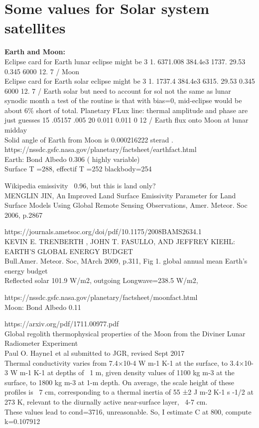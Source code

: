 \documentclass{article}
\begin{document}
\section{Some values for Solar system satellites \label{nomp}}

\textbf{Earth and Moon:} 
\\ Eclipse card for Earth lunar eclipse might be
 3 1. 6371.008 384.4e3 1737. 29.53 0.345 6000 12. 7 / Moon
\\ Eclipse card for Earth solar eclipse might be
 3 1. 1737.4 384.4e3 6315. 29.53 0.345 6000 12. 7 / Earth solar
\qi but need to account for sol not the same as lunar synodic month
\qii a test of the routine is that with bias=0, mid-eclipse would be about 6\% short of total.
Planetary FLux line:  thermal amplitude and phase are just guesses
15 .05157 .005  20 0.011 0.011  0  12  / Earth flux onto Moon at lunar midday
\\ Solid angle of Earth from Moon is  0.000216222 sterad
.
\\ https://nssdc.gsfc.nasa.gov/planetary/factsheet/earthfact.html
\\ Earth: Bond Albedo 0.306 ( highly variable) 
\\  Surface T =288, effectif T =252  blackbody=254
  
Wikipedia emissivity~ 0.96, but this is land only?
\\ MENGLIN JIN,  An Improved Land Surface Emissivity Parameter for Land Surface Models Using
Global Remote Sensing Observations, Amer. Meteor. Soc 2006, p.2867

https://journals.ametsoc.org/doi/pdf/10.1175/2008BAMS2634.1
\\ KEVIN E. TRENBERTH , JOHN T. FASULLO, AND JEFFREY KIEHL: EARTH'S GLOBAL ENERGY BUDGET
\\ Bull.Amer. Meteor. Soc, MArch 2009, p.311, Fig 1. global annual mean Earth's energy budget
\\ Reflected solar 101.9 W/m2, outgoing Longwave=238.5 W/m2,

https://nssdc.gsfc.nasa.gov/planetary/factsheet/moonfact.html
\\ Moon: Bond Albedo 0.11 

https://arxiv.org/pdf/1711.00977.pdf
\\ Global regolith thermophysical properties of the Moon from the Diviner Lunar Radiometer Experiment
\\ Paul O. Hayne1 et al submitted to JGR, revised Sept 2017
\\  Thermal conductivity varies from 7.4×10-4 W m-1 K-1 at the surface, to 3.4×10-3
 W m-1 K-1 at depths of ~1 m, given density values of 1100 kg m-3 at the
 surface, to 1800 kg m-3 at 1-m depth. On average, the scale height of these
 profiles is ~7 cm, corresponding to a thermal inertia of 55 ±2 J m-2 K-1 s -1/2
 at 273 K, relevant to the diurnally active near-surface layer, ~4-7 cm.
\\These values lead to cond=3716, unreasonable. So, I estimate C at 800, compute k=0.107912
\end{document}
